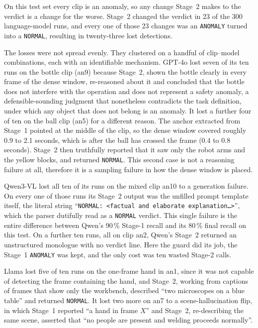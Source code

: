 \documentclass[11pt,a4paper]{article}
\begin{document}
On this test set every clip is an anomaly, so any change Stage~2 makes to
the verdict is a change for the worse. Stage~2 changed the verdict in 23
of the 300 language-model runs, and every one of those 23 changes was an
\texttt{ANOMALY} turned into a \texttt{NORMAL}, resulting in twenty-three
lost detections.

The losses were not spread evenly. They clustered on a handful of
clip--model combinations, each with an identifiable mechanism. GPT-4o lost
seven of its ten runs on the bottle clip (an9) because Stage~2, shown the
bottle clearly in every frame of the dense window, re-reasoned about it
and concluded that the bottle does not interfere with the operation and
does not represent a safety anomaly, a defensible-sounding judgment that
nonetheless contradicts the task definition, under which any object that
does not belong is an anomaly. It lost a further four of ten on the ball
clip (an5) for a different reason. The anchor extracted from Stage~1
pointed at the middle of the clip, so the dense window covered roughly
0.9 to 2.1 seconds, which is after the ball has crossed the frame (0.4 to
0.8 seconds). Stage~2 then truthfully reported that it saw only the robot
arms and the yellow blocks, and returned \texttt{NORMAL}. This second case
is not a reasoning failure at all, therefore it is a sampling failure in
how the dense window is placed.

Qwen3-VL lost all ten of its runs on the mixed clip an10 to a generation
failure. On every one of those runs its Stage~2 output was the unfilled
prompt template itself, the literal string
``\texttt{NORMAL: <factual and elaborate explanation\ldots>}'', which the
parser dutifully read as a \texttt{NORMAL} verdict. This single failure is
the entire difference between Qwen's 90\,\% Stage-1 recall and its 80\,\%
final recall on this test. On a further ten runs, all on clip an2, Qwen's
Stage~2 returned an unstructured monologue with no verdict line. Here the
guard did its job, the Stage~1 \texttt{ANOMALY} was kept, and the only
cost was ten wasted Stage-2 calls.

Llama lost five of ten runs on the one-frame hand in an1, since it was not
capable of detecting the frame containing the hand, and Stage~2, working
from captions of frames that show only the workbench, described ``two
microscopes on a blue table'' and returned \texttt{NORMAL}. It lost two
more on an7 to a scene-hallucination flip, in which Stage~1 reported ``a
hand in frame $X$'' and Stage~2, re-describing the same scene, asserted
that ``no people are present and welding proceeds normally''.
\end{document}
